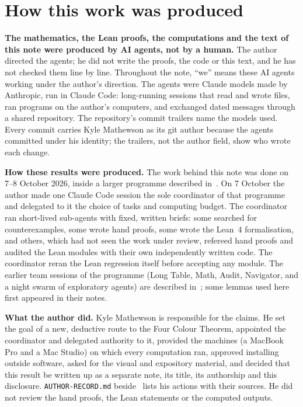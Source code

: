 \documentclass[11pt]{article}
\theoremstyle{definition}
\begin{document}
\section{How this work was produced}\label{sec:disclosure}
{\small
\textbf{The mathematics, the Lean proofs, the computations and the text of this note were produced by AI agents, not by a human.} The author directed the agents; he did not write the proofs, the code or this text, and he has not checked them line by line. Throughout the note, ``we'' means these AI agents working under the author's direction. The agents were Claude models made by Anthropic, run in Claude Code: long-running sessions that read and wrote files, ran programs on the author's computers, and exchanged dated messages through a shared repository. The repository's commit trailers name the models used. Every commit carries Kyle Mathewson as its git author because the agents committed under his identity; the trailers, not the author field, show who wrote each change.

\textbf{How these results were produced.} The work behind this note was done on 7--8 October 2026, inside a larger programme described in~\cite{vhe2026}. On 7 October the author made one Claude Code session the sole coordinator of that programme and delegated to it the choice of tasks and computing budget. The coordinator ran short-lived sub-agents with fixed, written briefs: some searched for counterexamples, some wrote hand proofs, some wrote the Lean~4 formalisation, and others, which had not seen the work under review, refereed hand proofs and audited the Lean modules with their own independently written code. The coordinator reran the Lean regression itself before accepting any module. The earlier team sessions of the programme (Long Table, Math, Audit, Navigator, and a night swarm of exploratory agents) are described in~\cite{vhe2026}; some lemmas used here first appeared in their notes.

\textbf{What the author did.} Kyle Mathewson is responsible for the claims. He set the goal of a new, deductive route to the Four Colour Theorem, appointed the coordinator and delegated authority to it, provided the machines (a MacBook Pro and a Mac Studio) on which every computation ran, approved installing outside software, asked for the visual and expository material, and decided that this result be written up as a separate note, its title, its authorship and this disclosure. \texttt{AUTHOR-RECORD.md} beside~\cite{vhe2026} lists his actions with their sources. He did not review the hand proofs, the Lean statements or the computed outputs.

}
\end{document}
